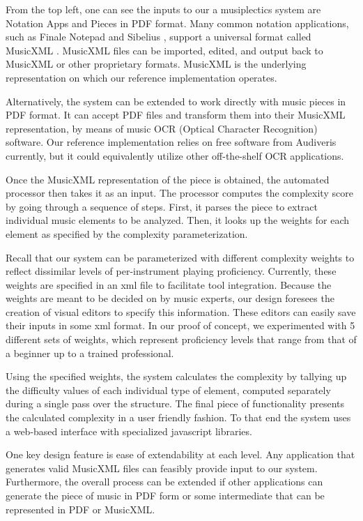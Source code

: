 \documentclass[12pt]{report}
\begin{document}
From the top left, one can see the inputs to our a musiplectics system are Notation Apps and Pieces in PDF format. Many common notation applications, such as Finale Notepad \cite{FinaleNotepad} and Sibelius \cite{Sibelius}, support a universal format called MusicXML \cite{MusicXML} \cite{Good2001}. MusicXML files can be imported, edited, and output back to MusicXML or other proprietary formats. MusicXML is the underlying representation on which our reference implementation operates.

Alternatively, the system can be extended to work directly with music pieces in PDF format. It can accept PDF files and transform them into their MusicXML representation, by means of music OCR (Optical Character Recognition) software. Our reference implementation relies on free software from Audiveris \cite{Audiveris} currently, but it could equivalently utilize other off-the-shelf OCR applications.

Once the MusicXML representation of the piece is obtained, the automated processor then takes it as an input. The processor computes the complexity score by going through a sequence of steps. First, it parses the piece to extract individual music elements to be analyzed. Then, it looks up the weights for each element as specified by the complexity parameterization.

Recall that our system can be parameterized with different complexity weights to reflect dissimilar levels of per-instrument playing proficiency. Currently, these weights are specified in an xml file to facilitate tool integration. Because the weights are meant to be decided on by music experts, our design foresees the creation of visual editors to specify this information. These editors can easily save their inputs in some xml format. In our proof of concept, we experimented with 5 different sets of weights, which represent proficiency levels that range from that of a beginner up to a trained professional.

Using the specified weights, the system calculates the complexity by tallying up the difficulty values of each individual type of element, computed separately during a single pass over the structure. The final piece of functionality presents the calculated complexity in a user friendly fashion. To that end the system uses a web-based interface with specialized javascript libraries.

One key design feature is ease of extendability at each level. Any application that generates valid MusicXML files can feasibly provide input to our system. Furthermore, the overall process can be extended if other applications can generate the piece of music in PDF form or some intermediate that can be represented in PDF or MusicXML.
\end{document}
